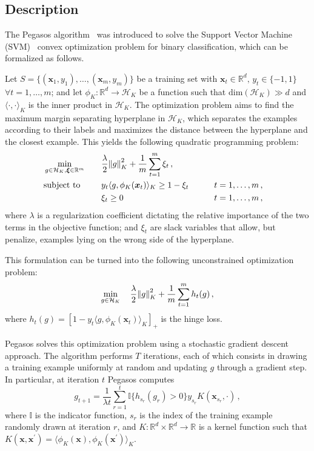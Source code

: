\documentclass[runningheads]{llncs}
\begin{document}
\subsection{Description}
\label{subsec:algorithm:description}

The Pegasos algorithm~\cite{shalev-pegasos-2011} was introduced to solve the Support Vector Machine (SVM)~\cite{vapnik-1999-statistical-learning} convex optimization problem for binary classification, which can be formalized as follows. 

Let $S = \{(\bm{x}_1,y_1),\dots,(\bm{x}_m,y_m)\}$ be a training set with $\bm{x}_t \in \mathbb{R}^d, \, y_t \in \{-1, 1\}$ $\forall t=1,\dots,m$; and let $\phi_K : \mathbb{R}^d \to \mathcal{H}_K$ be a function such that $\text{dim}(\mathcal{H}_K) \gg d$ and $\langle \cdot , \cdot \rangle_K$ is the inner product in $\mathcal{H}_K$. The optimization problem aims to find the maximum margin separating hyperplane in $\mathcal{H}_K$, which separates the examples according to their labels and maximizes the distance between the hyperplane and the closest example. This yields the following quadratic programming problem: 
\begin{alignat}{3}
  &\min_{g \in \mathcal{H}_K, \bm{\xi} \in \mathbb{R}^m} & \quad & \frac{\lambda}{2} \norm{g}_K^2 + \frac{1}{m}\sum_{t=1}^{m} \xi_t \, , \notag\\
  &\text{subject to}  &       & y_t \langle g, \phi_K(\bm{x}_t) \rangle_K \geq 1 - \xi_t &\qquad& t = 1,\dots,m \, , \notag\\
  &                   &       & \xi_t \geq 0  &\qquad& t = 1,\dots,m \, , \notag
\end{alignat}
where $\lambda$ is a regularization coefficient dictating the relative importance of the two terms in the objective function; and $\xi_t$ are slack variables that allow, but penalize, examples lying on the wrong side of the hyperplane.

This formulation can be turned into the following unconstrained optimization problem:
\[
  \min_{g \in \mathcal{H}_K} \quad \frac{\lambda}{2} \norm{g}_K^2 + \frac{1}{m}\sum_{t=1}^{m} h_t(g) \, ,
\]
where $h_t(g) = [1 - y_t\langle g, \phi_K(\bm{x}_t) \rangle_K]_+$ is the hinge loss.

Pegasos solves this optimization problem using a stochastic gradient descent approach. The algorithm performs $T$ iterations, each of which consists in drawing a training example uniformly at random and updating $g$ through a gradient step. In particular, at iteration $t$ Pegasos computes
\begin{equation}
  g_{t+1} = \frac{1}{\lambda t} \sum_{r = 1}^{t} \mathbb{I}\{h_{s_r}(g_r) > 0\} y_{s_r} K(\bm{x}_{s_r}, \cdot) \, , \label{eqn:pegasos:g}
\end{equation}
where $\mathbb{I}$ is the indicator function, $s_r$ is the index of the training example randomly drawn at iteration $r$, and $K : \mathbb{R}^d \times \mathbb{R}^d \to \mathbb{R}$ is a kernel function such that $K(\bm{x},\bm{x}^\prime) = \langle \phi_K(\bm{x}), \phi_K(\bm{x}^\prime) \rangle_K$.
\end{document}
